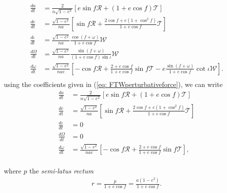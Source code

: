 \begin{subequations}\label{eq:OsculatingOrbitalElements}
\begin{align}
\frac{da}{dt} &= \frac{2}{n \sqrt{1-e^2}} \left[ e \sin f \mathcal{R} + (1+e\cos f) \mathcal{T} \right] \\
\frac{de}{dt} &= \frac{\sqrt{1-e^2}}{na} \left[ \sin f \mathcal{R} + \frac{2\cos f + e \left( 1 + \cos^2 f \right) }{1 + e\cos f} \mathcal{T} \right] \\
\frac{d \iota}{dt} &= \frac{\sqrt{1-e^2}}{na} \frac{\cos (f+\omega)}{1+e\cos f} \mathcal{W} \\
\frac{d \Omega}{dt} &= \frac{\sqrt{1-e^2}}{na} \frac{\sin (f+\omega)}{(1+e\cos f)\sin \iota } \mathcal{W} \\
\frac{d\omega}{dt} &=\frac{\sqrt{1-e^2}}{nae} \left[ -\cos f \mathcal{R} + \frac{2+e\cos f}{1 + e \cos f} \sin f \mathcal{T} - e  \frac{\sin (f + \omega)}{1 + e \cos f} \cot \iota \mathcal{W} \right].\\
\end{align}
\end{subequations}
using the coefficients given in (\ref{eq: FTWperturbativeforce}), we can write
\begin{subequations}
\begin{align}
\frac{da}{dt} &= \frac{2}{n \sqrt{1-e^2}} \left[ e \sin f \mathcal{R} + (1+e\cos f) \mathcal{T} \right] \\
\frac{de}{dt} &= \frac{\sqrt{1-e^2}}{na} \left[ \sin f \mathcal{R} + \frac{2\cos f + e \left( 1 + \cos^2 f \right) }{1 + e\cos f} \mathcal{T} \right] \\
\frac{d \iota}{dt} &= 0 \\
\frac{d \Omega}{dt} &= 0 \\
\frac{d\omega}{dt} &=\frac{\sqrt{1-e^2}}{nae} \left[ -\cos f \mathcal{R} + \frac{2+e\cos f}{1 + e \cos f} \sin f \mathcal{T}  \right], \\
\end{align}
\end{subequations}

where $p$ the \textit{semi-latus rectum}
\begin{align}
 r = \frac{p}{1+e\cos f} = \frac{a(1-e^2)}{1+e\cos f}.
\end{align}



